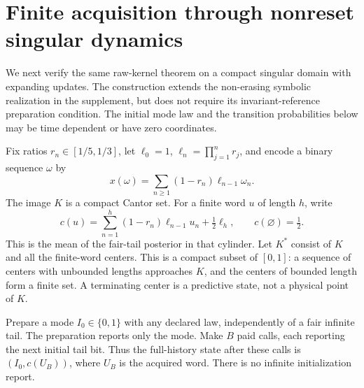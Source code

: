 \section{Finite acquisition through nonreset singular dynamics}\label{sec:singular}
We next verify the same raw-kernel theorem on a compact singular domain with expanding updates. The construction extends the non-erasing symbolic realization in the supplement, but does not require its invariant-reference preparation condition. The initial mode law and the transition probabilities below may be time dependent or have zero coordinates.

Fix ratios $r_n\in[1/5,1/3]$, let $\ell_0=1$, $\ell_n=\prod_{j=1}^n r_j$, and encode a binary sequence $\omega$ by
\begin{equation}\label{eq:cantor}
 x(\omega)=\sum_{n\ge1}(1-r_n)\ell_{n-1}\omega_n.
\end{equation}
The image $K$ is a compact Cantor set. For a finite word $u$ of length $h$, write
\begin{equation}\label{eq:cylinder}
 c(u)=\sum_{n=1}^h(1-r_n)\ell_{n-1}u_n+\tfrac12\ell_h,
 \qquad c(\varnothing)=\tfrac12.
\end{equation}
This is the mean of the fair-tail posterior in that cylinder. Let $K^*$ consist of $K$ and all the finite-word centers. This is a compact subset of $[0,1]$: a sequence of centers with unbounded lengths approaches $K$, and the centers of bounded length form a finite set. A terminating center is a predictive state, not a physical point of $K$.

Prepare a mode $I_0\in\{0,1\}$ with any declared law, independently of a fair infinite tail. The preparation reports only the mode. Make $B$ paid calls, each reporting the next initial tail bit. Thus the full-history state after these calls is $(I_0,c(U_B))$, where $U_B$ is the acquired word. There is no infinite initialization report.

